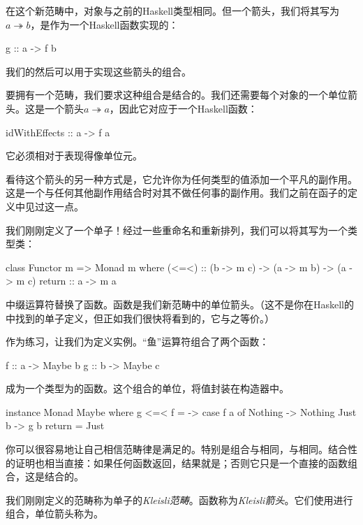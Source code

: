 \documentclass[DaoFP]{subfiles}
\begin{document}
在这个新范畴中，对象与之前的Haskell类型相同。但一个箭头，我们将其写为$a \twoheadrightarrow b$，是作为一个Haskell函数实现的：
\begin{haskell}
g :: a -> f b
\end{haskell}
我们的然后可以用于实现这些箭头的组合。

要拥有一个范畴，我们要求这种组合是结合的。我们还需要每个对象的一个单位箭头。这是一个箭头$a \twoheadrightarrow a$，因此它对应于一个Haskell函数：
\begin{haskell}
idWithEffects :: a -> f a
\end{haskell}
它必须相对于表现得像单位元。

看待这个箭头的另一种方式是，它允许你为任何类型的值添加一个平凡的副作用。这是一个与任何其他副作用结合时对其不做任何事的副作用。我们之前在函子的定义中见过这一点。

我们刚刚定义了一个单子！经过一些重命名和重新排列，我们可以将其写为一个类型类：
\begin{haskell}
class Functor m => Monad m where
  (<=<) :: (b -> m c) -> (a -> m b) -> (a -> m c)
  return :: a -> m a
\end{haskell}
中缀运算符\hask{<=<}替换了函数。函数是我们新范畴中的单位箭头。（这不是你在Haskell的中找到的单子定义，但正如我们很快将看到的，它与之等价。）

作为练习，让我们为定义实例。“鱼”运算符\hask{<=<}组合了两个函数：
\begin{haskell}
f :: a -> Maybe b
g :: b -> Maybe c
\end{haskell}
成为一个类型为的函数。这个组合的单位，将值封装在构造器中。
\begin{haskell}
instance Monad Maybe where
  g <=< f = \a -> case f a of
                    Nothing -> Nothing
                    Just b -> g b
  return = Just  
\end{haskell}

你可以很容易地让自己相信范畴律是满足的。特别是组合与相同，与相同。结合性的证明也相当直接：如果任何函数返回，结果就是；否则它只是一个直接的函数组合，这是结合的。

我们刚刚定义的范畴称为单子的\emph{Kleisli范畴}。函数称为\emph{Kleisli箭头}。它们使用\hask{<=<}进行组合，单位箭头称为。
\end{document}
